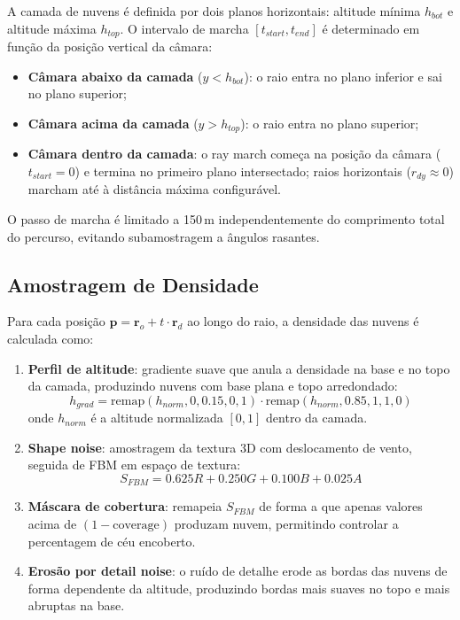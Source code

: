 A camada de nuvens é definida por dois planos horizontais: altitude mínima $h_{bot}$ e altitude máxima $h_{top}$. O intervalo de marcha $[t_{start}, t_{end}]$ é determinado em função da posição vertical da câmara:

\begin{itemize}
    \item \textbf{Câmara abaixo da camada} ($y < h_{bot}$): o raio entra no plano inferior e sai no plano superior;
    \item \textbf{Câmara acima da camada} ($y > h_{top}$): o raio entra no plano superior;
    \item \textbf{Câmara dentro da camada}: o ray march começa na posição da câmara ($t_{start} = 0$) e termina no primeiro plano intersectado; raios horizontais ($r_{dy} \approx 0$) marcham até à distância máxima configurável.
\end{itemize}

O passo de marcha é limitado a 150\,m independentemente do comprimento total do percurso, evitando subamostragem a ângulos rasantes.

\subsection{Amostragem de Densidade}
\label{chap4:subsec:densidade}

Para cada posição $\mathbf{p} = \mathbf{r}_o + t \cdot \mathbf{r}_d$ ao longo do raio, a densidade das nuvens é calculada como:

\begin{enumerate}
    \item \textbf{Perfil de altitude}: gradiente suave que anula a densidade na base e no topo da camada, produzindo nuvens com base plana e topo arredondado:
    \begin{equation}
    h_{grad} = \text{remap}(h_{norm}, 0, 0.15, 0, 1) \cdot \text{remap}(h_{norm}, 0.85, 1, 1, 0)
    \label{eq:hgrad}
    \end{equation}
    onde $h_{norm}$ é a altitude normalizada $[0,1]$ dentro da camada.

    \item \textbf{Shape noise}: amostragem da textura 3D com deslocamento de vento, seguida de FBM em espaço de textura:
    \begin{equation}
    S_{FBM} = 0.625 R + 0.250 G + 0.100 B + 0.025 A
    \label{eq:sfbm}
    \end{equation}

    \item \textbf{Máscara de cobertura}: remapeia $S_{FBM}$ de forma a que apenas valores acima de $(1 - \text{coverage})$ produzam nuvem, permitindo controlar a percentagem de céu encoberto.

    \item \textbf{Erosão por detail noise}: o ruído de detalhe erode as bordas das nuvens de forma dependente da altitude, produzindo bordas mais suaves no topo e mais abruptas na base.
\end{enumerate}

